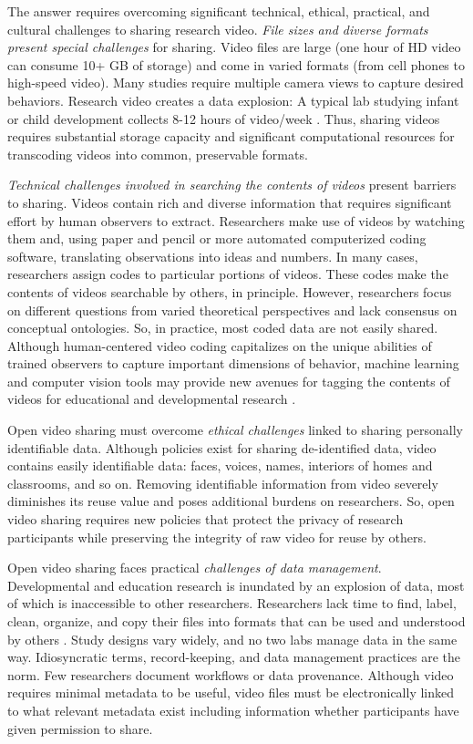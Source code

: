 \documentclass[letterpaper,man,apacite]{apa6}
\begin{document}
The answer requires overcoming significant technical, ethical, practical, and cultural challenges to sharing research video. 
\emph{File sizes and diverse formats present special challenges} for sharing. 
Video files are large (one hour of HD video can consume 10+ GB of storage) and come in varied formats (from cell phones to high-speed video). 
Many studies require multiple camera views to capture desired behaviors. 
Research video creates a data explosion: A typical lab studying infant or child development collects 8-12 hours of video/week \cite{Survey2012}. 
Thus, sharing videos requires substantial storage capacity and significant computational resources for transcoding videos into common, preservable formats.

\emph{Technical challenges involved in searching the contents of videos} present barriers to sharing. 
Videos contain rich and diverse information that requires significant effort by human observers to extract. 
Researchers make use of videos by watching them and, using paper and pencil or more automated computerized coding software, translating observations into ideas and numbers. 
In many cases, researchers assign codes to particular portions of videos.
These codes make the contents of videos searchable by others, in principle. 
However, researchers focus on different questions from varied theoretical perspectives and lack consensus on conceptual ontologies.
So, in practice, most coded data are not easily shared. 
Although human-centered video coding capitalizes on the unique abilities of trained observers to capture important dimensions of behavior, machine learning and computer vision tools may provide new avenues for tagging the contents of videos for educational and developmental research \cite{Amso2014,ChenYu2013,Fathi2012,Google2014,Raudies2014}.

Open video sharing must overcome \emph{ethical challenges} linked to sharing personally identifiable data. 
Although policies exist for sharing de-identified data, video contains easily identifiable data: faces, voices, names, interiors of homes and classrooms, and so on. 
Removing identifiable information from video severely diminishes its reuse value and poses additional burdens on researchers. 
So, open video sharing requires new policies that protect the privacy of research participants while preserving the integrity of raw video for reuse by others.

Open video sharing faces practical \emph{challenges of data management}. 
Developmental and education research is inundated by an explosion of data, most of which is inaccessible to other researchers.
Researchers lack time to find, label, clean, organize, and copy their files into formats that can be used and understood by others \cite{Ascoli2006}. 
Study designs vary widely, and no two labs manage data in the same way. 
Idiosyncratic terms, record-keeping, and data management practices are the norm. 
Few researchers document workflows or data provenance. 
Although video requires minimal metadata to be useful, video files must be electronically linked to what relevant metadata exist including information whether participants have given permission to share.
\end{document}

